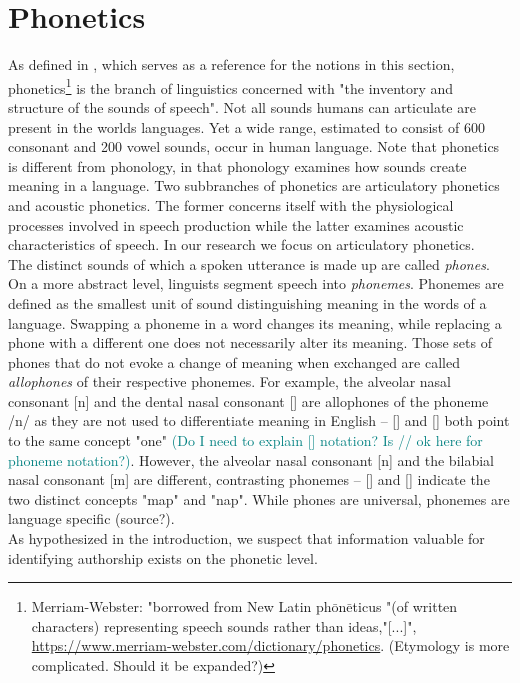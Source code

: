 \section{Phonetics}\label{sec:phonetics}
As defined in \cite{ogrady2017introToLinguistics}, which serves as a reference for the notions in this section, phonetics\footnote{Merriam-Webster: "borrowed from New Latin ph$\bar{\mbox{o}}$n$\bar{\mbox{e}}$ticus "(of written characters) representing speech sounds rather than ideas,"[...]", \url{https://www.merriam-webster.com/dictionary/phonetics}. (Etymology is more complicated. Should it be expanded?)} is the branch of linguistics concerned with "the inventory and structure of the sounds of speech".
Not all sounds humans can articulate are present in the worlds languages.
Yet a wide range, estimated to consist of 600 consonant and 200 vowel sounds, occur in human language.
Note that phonetics is different from phonology, in that phonology examines how sounds create meaning in a language.
Two subbranches of phonetics are articulatory phonetics and acoustic phonetics.
The former concerns itself with the physiological processes involved in speech production while the latter examines acoustic characteristics of speech.
In our research we focus on articulatory phonetics.\\
The distinct sounds of which a spoken utterance is made up are called \textit{phones}.
On a more abstract level, linguists segment speech into \textit{phonemes}.
Phonemes are defined as the smallest unit of sound distinguishing meaning in the words of a language.
Swapping a phoneme in a word changes its meaning, while replacing a phone with a different one does not necessarily alter its meaning.
Those sets of phones that do not evoke a change of meaning when exchanged are called \textit{allophones} of their respective phonemes.
For example, the alveolar nasal consonant [n] and the dental nasal consonant [\textipa{\|[n}] are allophones of the phoneme /n/ as they are not used to differentiate meaning in English -- [] and [\textipa{w2\|[n}] both point to the same concept "one" \textcolor{teal}{(Do I need to explain [] notation? Is // ok here for phoneme notation?)}.
However, the alveolar nasal consonant [n] and the bilabial nasal consonant [m] are different, contrasting phonemes -- [] and [] indicate the two distinct concepts "map" and "nap".
While phones are universal, phonemes are language specific (source?).\\
As hypothesized in the introduction, we suspect that information valuable for identifying authorship exists on the phonetic level.
